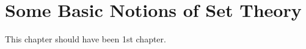 \documentclass[class=mike-apostol-mathematical-analysis,crop=false]{standalone}
\begin{document}
\chapter{Some Basic Notions of Set Theory}

\par This chapter should have been 1st chapter.
\end{document}
